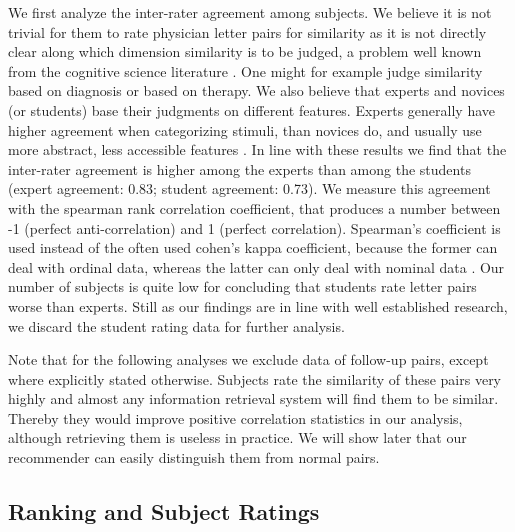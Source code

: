 We first analyze the inter-rater agreement among subjects. We believe it is not trivial for them to rate physician letter pairs for similarity as it is not directly clear along which dimension similarity is to be judged, a problem well known from the cognitive science literature \citep{Medin1993}. One might for example judge similarity based on diagnosis or based on therapy. We also believe that experts and novices (or students) base their judgments on different features. Experts generally have higher agreement when categorizing stimuli, than novices do, and usually use more abstract, less accessible features \citep{Chi1981, Linhares2007, Leon-Villagra2013}. In line with these results we find that the inter-rater agreement is higher among the experts than among the students (expert agreement: 0.83; student agreement: 0.73). We measure this agreement with the spearman rank correlation coefficient, that produces a number between -1 (perfect anti-correlation) and 1 (perfect correlation). Spearman's coefficient is used instead of the often used cohen's kappa coefficient, because the former can deal with ordinal data, whereas the latter can only deal with nominal data \citep{Spearman1904, Cohen1960}. Our number of subjects is quite low for concluding that students rate letter pairs worse than experts. Still as our findings are in line with well established research, we discard the student rating data for further analysis. 

Note that for the following analyses we exclude data of follow-up pairs, except where explicitly stated otherwise. Subjects rate the similarity of these pairs very highly and almost any information retrieval system will find them to be similar. Thereby they would improve positive correlation statistics in our analysis, although retrieving them is useless in practice. We will show later that our recommender can easily distinguish them from normal pairs.

\subsection*{Ranking and Subject Ratings}

